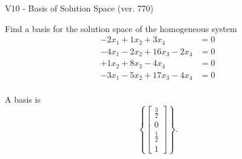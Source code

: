 \begin{exercise}
  \begin{exerciseTitle}V10 - Basis of Solution Space (ver. 770)\end{exerciseTitle}
  \begin{exerciseStatement}
    Find a basis for the solution space of the homogeneous system 
\begin{align*}
 -2 x_ 1 + 1 x_ 2 + 3 x_ 4 &= 0  \\ 
  -4 x_ 1 -2 x_ 2 + 16 x_ 3 -2 x_ 4 &= 0  \\ 
  + 1 x_ 2 + 8 x_ 3 -4 x_ 4 &= 0  \\ 
  -3 x_ 1 -5 x_ 2 + 17 x_ 3 -4 x_ 4 &= 0  \\ 
 \end{align*}


 
  \end{exerciseStatement}

  \begin{exerciseAnswer}
   A basis is   
\[\left\{\left[\begin{array}{c}
\frac{3}{2} \\
0 \\
\frac{1}{2} \\
1
\end{array}\right]\right\}.\]

  


  \end{exerciseAnswer}
\end{exercise}